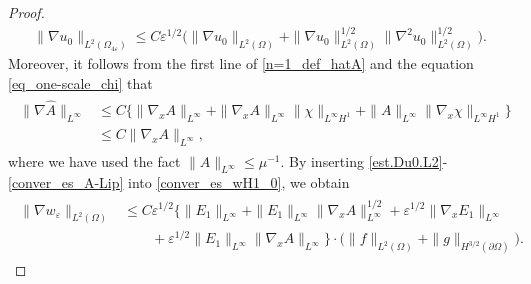 \documentclass[reqno,12pt]{amsart} %
\theoremstyle{definition}
\theoremstyle{remark}
\numberwithin{equation}{section}
\newcommand{\e}{\varepsilon}
\begin{document}
\begin{proof}
\begin{align}
    \| \nabla u_0 \|_{L^2(\Omega_{4\e})} \le C\e^{1/2} \big(\| \nabla u_0 \|_{L^2(\Omega)} + \| \nabla u_0 \|_{L^2(\Omega)}^{1/2} \| \nabla^2 u_0 \|_{L^2(\Omega)}^{1/2}\big).
\end{align}
Moreover, it follows from the first line of \eqref{n=1_def_hatA} and the equation \eqref{eq_one-scale_chi} that
\begin{align}\label{conver_es_A-Lip}
\begin{split}
    \|\nabla \widehat{A}\|_{L^\infty} & \leq C \big\{\|\nabla_xA\|_{L^\infty}+\|\nabla_xA\|_{L^\infty}\|\chi\|_{L^\infty H^1}+\|A\|_{L^\infty}\|\nabla_x\chi\|_{L^\infty H^1} \big\} \\
    & \leq C\|\nabla_xA\|_{L^\infty},
\end{split}
\end{align}
where we have used the fact $\|A\|_{L^\infty}\leq \mu^{-1}$. By inserting \eqref{est.Du0.L2}-\eqref{conver_es_A-Lip} into \eqref{conver_es_wH1_0}, we obtain
\begin{align}\label{conver_es_w_H1}
  \begin{split}
    \|\nabla w_\varepsilon\|_{L^2(\Omega)} & \leq C\varepsilon^{1/2} \Big\{ \|E_1\|_{L^\infty}+\|E_1\|_{L^\infty}\|\nabla_xA\|_{L^\infty}^{1/2}+\varepsilon^{1/2}\|\nabla_xE_1\|_{L^\infty}\\
    &\qquad + \varepsilon^{1/2}\|E_1\|_{L^\infty}\|\nabla_xA\|_{L^\infty} \Big\} \cdot \Big(\|f\|_{L^2(\Omega)}+\|g\|_{H^{3/2}(\partial \Omega)}\Big). 
  \end{split}
\end{align}


\end{proof}
\end{document}
